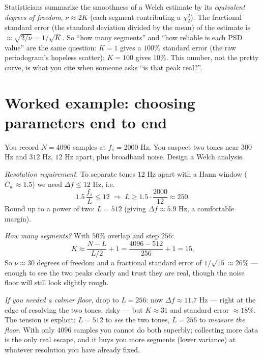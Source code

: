 \begin{remark}
\label{ch21:edof}
Statisticians summarize the smoothness of a Welch estimate by its
\emph{equivalent degrees of freedom}, $\nu \approx 2K$ (each segment contributing a
$\chi^2_2$). The fractional standard error (the standard deviation divided by the mean) of the estimate is $\approx
\sqrt{2/\nu} = 1/\sqrt{K}$. So ``how many segments'' and ``how reliable is each PSD
value'' are the same question: $K=1$ gives a $100\%$ standard error (the raw
periodogram's hopeless scatter); $K=100$ gives $10\%$. This number, not the pretty
curve, is what you cite when someone asks ``is that peak real?''.
\end{remark}

\section{Worked example: choosing parameters end to end}
\label{ch21:worked}

\begin{example}
\label{ch21:ex-twotone}
You record $N=4096$ samples at $f_s=2000$ Hz. You suspect two tones near $300$ Hz
and $312$ Hz, $12$ Hz apart, plus broadband noise. Design a Welch analysis.

\emph{Resolution requirement.} To separate tones $12$ Hz apart with a Hann window
($C_w\approx 1.5$) we need $\Delta f \le 12$ Hz, i.e.
\[
1.5\,\frac{f_s}{L} \le 12 \;\Rightarrow\; L \ge 1.5\cdot\frac{2000}{12} \approx 250.
\]
Round up to a power of two: $L = 512$ (giving $\Delta f \approx 5.9$ Hz, a
comfortable margin).

\emph{How many segments?} With $50\%$ overlap and step $256$:
\[
K \approx \frac{N - L}{L/2} + 1 = \frac{4096 - 512}{256} + 1 = 15.
\]
So $\nu\approx 30$ degrees of freedom and a fractional standard error of
$1/\sqrt{15}\approx 26\%$ --- enough to see the two peaks clearly and trust they
are real, though the noise floor will still look slightly rough.

\emph{If you needed a calmer floor}, drop to $L=256$: now $\Delta f\approx 11.7$ Hz
--- right at the edge of resolving the two tones, risky --- but $K\approx 31$ and
standard error $\approx 18\%$. The tension is explicit: $L=512$ to \emph{see} the
two tones, $L=256$ to \emph{measure the floor}. With only $4096$ samples you cannot
do both superbly; collecting more data is the only real escape, and it buys you
more segments (lower variance) at whatever resolution you have already fixed.
\end{example}

